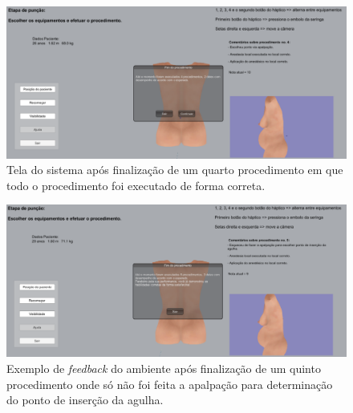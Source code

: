 \begin{figure}[ht!]
    \centering
    \includegraphics[width=\textwidth]{capitulos/figuras/sistema-exemplo-execucao-procedimento-4.png} 
    \caption{Tela do sistema após finalização de um quarto procedimento em que todo o procedimento foi executado de forma correta.}
    \label{fig:sistemaExecucao4correto}
\end{figure}

\begin{figure}[ht!]
    \centering
    \includegraphics[width=\textwidth]{capitulos/figuras/sistema-exemplo-execucao-procedimento-5.png} 
    \caption{Exemplo de \textit{feedback} do ambiente após finalização de um quinto procedimento onde só não foi feita a apalpação para determinação do ponto de inserção da agulha.}
    \label{fig:sistemaExecucao5semApalpacaoCorreto}
\end{figure}

